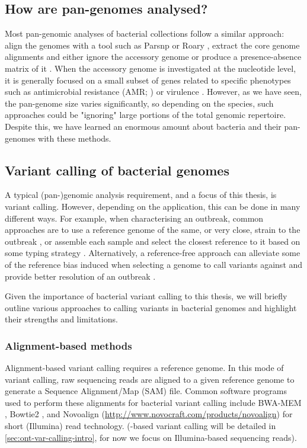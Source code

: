 \subsection{How are pan-genomes analysed?}
\label{sec:analyse-pangenome}

Most pan-genomic analyses of bacterial collections follow a similar approach: align the genomes with a tool such as Parsnp \cite{Treangen2014} or Roary \cite{Page2015}, extract the core genome alignments and either ignore the accessory genome or produce a presence-absence matrix of it \cite{Arnold2018,Azarian2018,McNally2016,thepangenome2020}. When the accessory genome is investigated at the nucleotide level, it is generally focused on a small subset of genes related to specific phenotypes such as antimicrobial resistance (AMR; \cite{Boolchandani2019}) or virulence \cite{Vasquez2019}. However, as we have seen, the pan-genome size varies significantly, so depending on the species, such approaches could be "ignoring" large portions of the total genomic repertoire. Despite this, we have learned an enormous amount about bacteria and their pan-genomes with these methods.

\subsection{Variant calling of bacterial genomes}
\label{sec:intro-bacteria-var-call}

A typical (pan-)genomic analysis requirement, and a focus of this thesis, is variant calling. However, depending on the application, this can be done in many different ways. For example, when characterising an outbreak, common approaches are to use a reference genome of the same, or very close, strain to the outbreak \cite{Taylor2015}, or assemble each sample and select the closest reference to it based on some typing strategy \cite{Wyres2021}. Alternatively, a reference-free approach can alleviate some of the reference bias induced when selecting a genome to call variants against and provide better resolution of an outbreak \cite{Cremers2020}.

Given the importance of bacterial variant calling to this thesis, we will briefly outline various approaches to calling variants in bacterial genomes and highlight their strengths and limitations.

\subsubsection{Alignment-based methods}
\label{sec:aln-var-call}
Alignment-based variant calling requires a reference genome. In this mode of variant calling, raw sequencing reads are aligned to a given reference genome to generate a Sequence Alignment/Map (SAM) file. Common software programs used to perform these alignments for bacterial variant calling include BWA-MEM \cite{li2013}, Bowtie2 \cite{bowtie2012}, and Novoalign (\url{http://www.novocraft.com/products/novoalign}) for short (Illumina) read technology. (\ont{}-based variant calling will be detailed in \autoref{sec:ont-var-calling-intro}, for now we focus on Illumina-based sequencing reads). 


